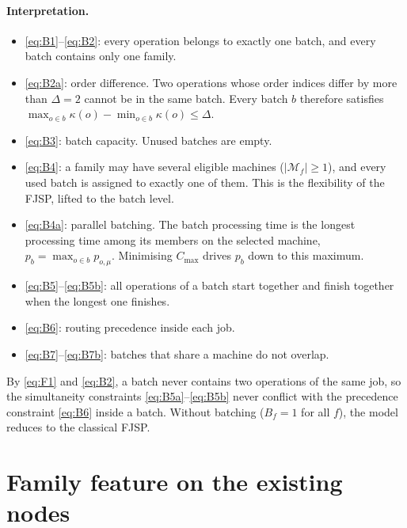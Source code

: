 \documentclass[11pt,a4paper]{article}
\newcommand{\Mset}{\mathcal{M}}
\begin{document}
\paragraph{Interpretation.}
\begin{itemize}
  \item \eqref{eq:B1}--\eqref{eq:B2}: every operation belongs to exactly one batch, and every batch contains only one family.
  \item \eqref{eq:B2a}: order difference. Two operations whose order indices differ by more than $\Delta=2$ cannot be in the same batch. Every batch $b$ therefore satisfies $\max_{o\in b}\kappa(o)-\min_{o\in b}\kappa(o)\le\Delta$.
  \item \eqref{eq:B3}: batch capacity. Unused batches are empty.
  \item \eqref{eq:B4}: a family may have several eligible machines ($|\Mset_f|\ge1$), and every used batch is assigned to exactly one of them. This is the flexibility of the FJSP, lifted to the batch level.
  \item \eqref{eq:B4a}: parallel batching. The batch processing time is the longest processing time among its members on the selected machine, $p_b=\max_{o\in b}p_{o,\mu}$. Minimising $C_{\max}$ drives $p_b$ down to this maximum.
  \item \eqref{eq:B5}--\eqref{eq:B5b}: all operations of a batch start together and finish together when the longest one finishes.
  \item \eqref{eq:B6}: routing precedence inside each job.
  \item \eqref{eq:B7}--\eqref{eq:B7b}: batches that share a machine do not overlap.
\end{itemize}
By \eqref{eq:F1} and \eqref{eq:B2}, a batch never contains two operations of the same
job, so the simultaneity constraints \eqref{eq:B5a}--\eqref{eq:B5b} never conflict
with the precedence constraint \eqref{eq:B6} inside a batch. Without batching
($B_f=1$ for all $f$), the model reduces to the classical FJSP.

\section{Family feature on the existing nodes}
\label{sec:familyfeature}
\end{document}
